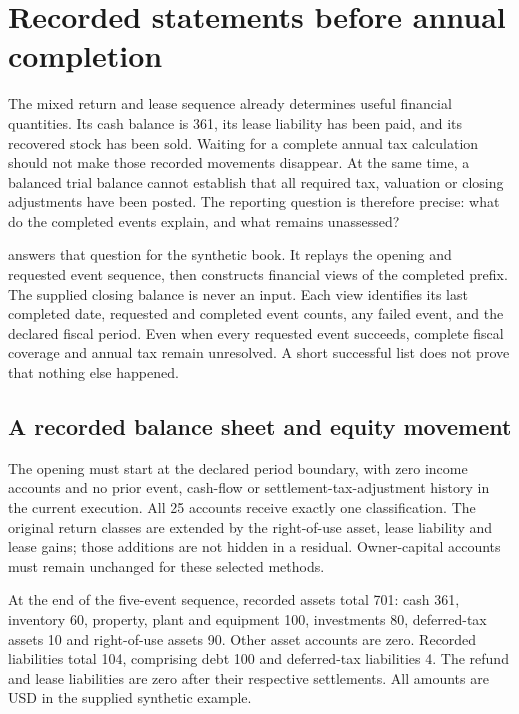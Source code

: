 
\section{Recorded statements before annual completion}
\label{sec:recorded-shared-statements}

The mixed return and lease sequence already determines useful financial
quantities. Its cash balance is 361, its lease liability has been paid, and its
recovered stock has been sold. Waiting for a complete annual tax calculation
should not make those recorded movements disappear. At the same time, a
balanced trial balance cannot establish that all required tax, valuation or
closing adjustments have been posted. The reporting question is therefore
precise: what do the completed events explain, and what remains unassessed?

 answers that question for the synthetic
book. It replays the opening and requested event sequence, then constructs
financial views of the completed prefix. The supplied closing balance is never
an input. Each view identifies its last completed date, requested and completed
event counts, any failed event, and the declared fiscal period. Even when every
requested event succeeds, complete fiscal coverage and annual tax remain
unresolved. A short successful list does not prove that nothing else happened.

\subsection{A recorded balance sheet and equity movement}

The opening must start at the declared period boundary, with zero income
accounts and no prior event, cash-flow or settlement-tax-adjustment history in
the current execution. All 25 accounts receive exactly one classification.
The original return classes are extended by the right-of-use asset, lease
liability and lease gains; those additions are not hidden in a residual.
Owner-capital accounts must remain unchanged for these selected methods.

At the end of the five-event sequence, recorded assets total 701: cash 361,
inventory 60, property, plant and equipment 100, investments 80, deferred-tax
assets 10 and right-of-use assets 90. Other asset accounts are zero. Recorded
liabilities total 104, comprising debt 100 and deferred-tax liabilities 4.
The refund and lease liabilities are zero after their respective settlements.
All amounts are USD in the supplied synthetic example.

